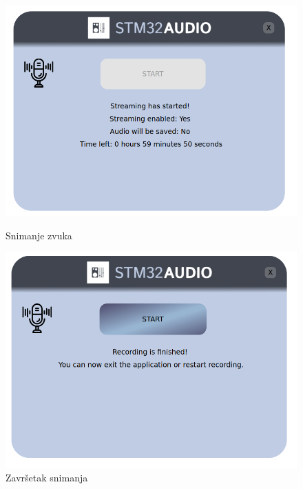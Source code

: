 \begin{figure}[ht]
	\begin{minipage}[t]{0.4\textwidth}
	\includegraphics[width=\linewidth]{imgs/recording_form_3}
	\caption{Snimanje zvuka}
	\label{fig:recording_form_3}
	\end{minipage}
	\hspace*{\fill}
	\begin{minipage}[t]{0.4\textwidth}
		\includegraphics[width=\linewidth]{imgs/recording_form_4}
		\caption{Završetak snimanja}
		\label{fig:recording_form_4}
	\end{minipage}
\end{figure}

\eject
